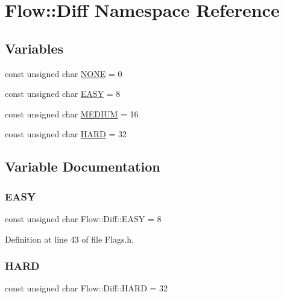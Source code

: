 \hypertarget{namespace_flow_1_1_diff}{}\section{Flow\+:\+:Diff Namespace Reference}
\label{namespace_flow_1_1_diff}
\subsection*{Variables}
\begin{DoxyCompactItemize}
\item 
const unsigned char \hyperlink{namespace_flow_1_1_diff_a25211e3502f69e2908f0f7a0704a791c}{N\+O\+NE} = 0
\item 
const unsigned char \hyperlink{namespace_flow_1_1_diff_a74626099944a6e3bba9dd65249e2d1af}{E\+A\+SY} = 8
\item 
const unsigned char \hyperlink{namespace_flow_1_1_diff_a2a571fad912e041a39f438cdabb5b205}{M\+E\+D\+I\+UM} = 16
\item 
const unsigned char \hyperlink{namespace_flow_1_1_diff_afda4e2a42f3b99975b1c79d953424f59}{H\+A\+RD} = 32
\end{DoxyCompactItemize}


\subsection{Variable Documentation}
\hypertarget{namespace_flow_1_1_diff_a74626099944a6e3bba9dd65249e2d1af}{}\label{namespace_flow_1_1_diff_a74626099944a6e3bba9dd65249e2d1af} 
\subsubsection{\texorpdfstring{E\+A\+SY}{EASY}}
{\footnotesize\ttfamily const unsigned char Flow\+::\+Diff\+::\+E\+A\+SY = 8}



Definition at line 43 of file Flags.\+h.

\hypertarget{namespace_flow_1_1_diff_afda4e2a42f3b99975b1c79d953424f59}{}\label{namespace_flow_1_1_diff_afda4e2a42f3b99975b1c79d953424f59} 
\subsubsection{\texorpdfstring{H\+A\+RD}{HARD}}
{\footnotesize\ttfamily const unsigned char Flow\+::\+Diff\+::\+H\+A\+RD = 32}



